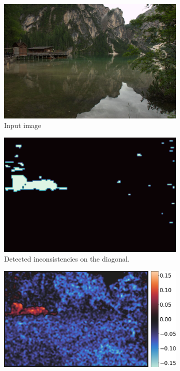 \documentclass{ipol}
\begin{document}
\begin{figure}[ht]
        \begin{subfigure}[t]{.3015\linewidth}
                \includegraphics[width=\linewidth]{images/aahd_nodual/image.jpeg}
                \caption{Input image}
        \end{subfigure}\hfill%
        \begin{subfigure}[t]{.3015\linewidth}
                \includegraphics[width=\linewidth]{images/aahd_nodual/out_inconsistent_diag_thr_fig.png}
                \caption{Detected inconsistencies on the diagonal.}
        \end{subfigure}\hfill%
        \begin{subfigure}[t]{.3585\linewidth}
                \includegraphics[width=\linewidth]{images/aahd_nodual/out_diff_diag.png}

\end{subfigure}
\end{figure}
\end{document}
